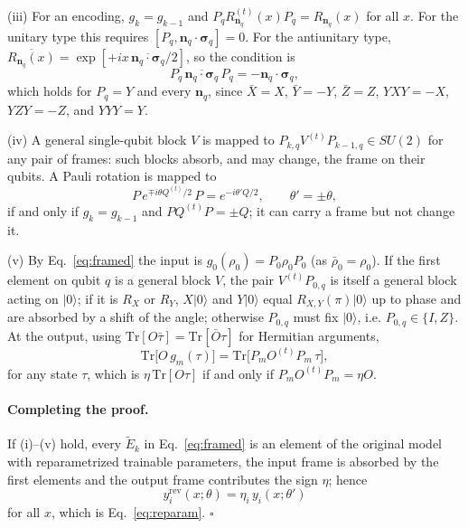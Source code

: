 \documentclass[
 aps,pra,
 twocolumn,
 superscriptaddress,
 longbibliography,
 nofootinbib
]{revtex4-2}
\newcommand{\Tr}{\mathrm{Tr}}
\providecommand{\ket}[1]{\lvert #1 \rangle}
\begin{document}
(iii) For an encoding, $g_k=g_{k-1}$ and $P_q R^{(t)}_{\mathbf n_q}(x)P_q=R_{\mathbf n_q}(x)$ for
all $x$. For the unitary type this requires $[P_q,\mathbf n_q\cdot\boldsymbol\sigma_q]=0$. For
the antiunitary type, $\overline{R_{\mathbf n_q}(x)}=\exp[+ix\,\overline{\mathbf n_q\cdot\boldsymbol\sigma_q}/2]$,
so the condition is
\begin{equation}
P_q\,\overline{\mathbf n_q\cdot\boldsymbol\sigma_q}\,P_q=-\mathbf n_q\cdot\boldsymbol\sigma_q ,
\label{eq:app_iii}
\end{equation}
which holds for $P_q=Y$ and every $\mathbf n_q$, since $\bar X=X$, $\bar Y=-Y$, $\bar Z=Z$,
$YXY=-X$, $YZY=-Z$, and $YYY=Y$.

(iv) A general single-qubit block $V$ is mapped to $P_{k,q}V^{(t)}P_{k-1,q}\in SU(2)$ for any
pair of frames: such blocks absorb, and may change, the frame on their qubits. A Pauli
rotation is mapped to
\begin{equation}
P\,e^{\mp i\theta Q^{(t)}/2}\,P=e^{-i\theta' Q/2},\qquad \theta'=\pm\theta ,
\label{eq:app_iv}
\end{equation}
if and only if $g_k=g_{k-1}$ and $PQ^{(t)}P=\pm Q$; it can carry a frame but not change it.

(v) By Eq.~\eqref{eq:framed} the input is $g_0(\rho_0)=P_0\rho_0P_0$ (as $\bar\rho_0=\rho_0$).
If the first element on qubit $q$ is a general block $V$, the pair $V^{(t)}P_{0,q}$ is itself
a general block acting on $\ket 0$; if it is $R_X$ or $R_Y$, $X\ket0$ and $Y\ket0$ equal
$R_{X,Y}(\pi)\ket0$ up to phase and are absorbed by a shift of the angle; otherwise $P_{0,q}$
must fix $\ket0$, i.e. $P_{0,q}\in\{I,Z\}$. At the output, using
$\Tr[O\bar\tau]=\Tr[\bar O\tau]$ for Hermitian arguments,
\begin{equation}
\Tr\bigl[O\,g_m(\tau)\bigr]=\Tr\bigl[P_mO^{(t)}P_m\,\tau\bigr],
\label{eq:app_v}
\end{equation}
for any state $\tau$, which is $\eta\,\Tr[O\tau]$ if and only if $P_mO^{(t)}P_m=\eta O$.

\paragraph{Completing the proof.}
If (i)--(v) hold, every $\tilde E_k$ in Eq.~\eqref{eq:framed} is an element of the original
model with reparametrized trainable parameters, the input frame is absorbed by the first
elements and the output frame contributes the sign $\eta$; hence
\begin{equation}
y^{\mathrm{rev}}_i(x;\theta)=\eta_i\,y_i(x;\theta')
\end{equation}
for all $x$, which is Eq.~\eqref{eq:reparam}. \hfill$\square$
\end{document}
